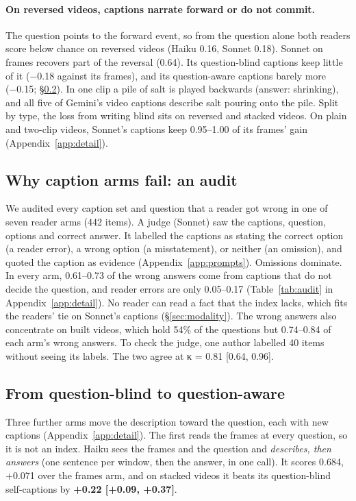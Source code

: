 \documentclass[11pt]{article}
\begin{document}
\paragraph{On reversed videos, captions narrate forward or do not commit.} The question points to the forward event, so from the question alone both readers score below chance on reversed videos (Haiku 0.16, Sonnet 0.18). Sonnet on frames recovers part of the reversal (0.64). Its question-blind captions keep little of it (−0.18 against its frames), and its question-aware captions barely more (−0.15; \S\ref{sec:aware}). In one clip a pile of salt is played backwards (answer: shrinking), and all five of Gemini's video captions describe salt pouring onto the pile. Split by type, the loss from writing blind sits on reversed and stacked videos. On plain and two-clip videos, Sonnet's captions keep 0.95--1.00 of its frames' gain (Appendix~\ref{app:detail}).

\subsection{Why caption arms fail: an audit}
\label{sec:audit}

We audited every caption set and question that a reader got wrong in one of seven reader arms (442 items). A judge (Sonnet) saw the captions, question, options and correct answer. It labelled the captions as stating the correct option (a reader error), a wrong option (a misstatement), or neither (an omission), and quoted the caption as evidence (Appendix~\ref{app:prompts}). Omissions dominate. In every arm, 0.61--0.73 of the wrong answers come from captions that do not decide the question, and reader errors are only 0.05--0.17 (Table~\ref{tab:audit} in Appendix~\ref{app:detail}). No reader can read a fact that the index lacks, which fits the readers' tie on Sonnet's captions (\S\ref{sec:modality}). The wrong answers also concentrate on built videos, which hold 54\% of the questions but 0.74--0.84 of each arm's wrong answers. To check the judge, one author labelled 40 items without seeing its labels. The two agree at κ = 0.81 [0.64, 0.96].

\subsection{From question-blind to question-aware}
\label{sec:aware}

Three further arms move the description toward the question, each with new captions (Appendix~\ref{app:detail}). The first reads the frames at every question, so it is not an index. Haiku sees the frames and the question and \emph{describes, then answers} (one sentence per window, then the answer, in one call). It scores 0.684, +0.071 over the frames arm, and on stacked videos it beats its question-blind self-captions by \textbf{+0.22 [+0.09, +0.37]}.
\end{document}
